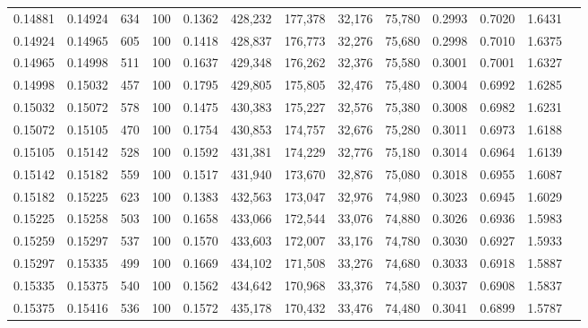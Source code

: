 \begin{tabular}{rrrrrrrrrrrrr}
0.14881 & 0.14924 &   634 & 100 &                                     0.1362 & 428,232 & 177,378 &  32,176 &  75,780 & 0.2993 & 0.7020 & 1.6431 \\
0.14924 & 0.14965 &   605 & 100 &                                     0.1418 & 428,837 & 176,773 &  32,276 &  75,680 & 0.2998 & 0.7010 & 1.6375 \\
0.14965 & 0.14998 &   511 & 100 &                                     0.1637 & 429,348 & 176,262 &  32,376 &  75,580 & 0.3001 & 0.7001 & 1.6327 \\
0.14998 & 0.15032 &   457 & 100 &                                     0.1795 & 429,805 & 175,805 &  32,476 &  75,480 & 0.3004 & 0.6992 & 1.6285 \\
0.15032 & 0.15072 &   578 & 100 &                                     0.1475 & 430,383 & 175,227 &  32,576 &  75,380 & 0.3008 & 0.6982 & 1.6231 \\
0.15072 & 0.15105 &   470 & 100 &                                     0.1754 & 430,853 & 174,757 &  32,676 &  75,280 & 0.3011 & 0.6973 & 1.6188 \\
0.15105 & 0.15142 &   528 & 100 &                                     0.1592 & 431,381 & 174,229 &  32,776 &  75,180 & 0.3014 & 0.6964 & 1.6139 \\
0.15142 & 0.15182 &   559 & 100 &                                     0.1517 & 431,940 & 173,670 &  32,876 &  75,080 & 0.3018 & 0.6955 & 1.6087 \\
0.15182 & 0.15225 &   623 & 100 &                                     0.1383 & 432,563 & 173,047 &  32,976 &  74,980 & 0.3023 & 0.6945 & 1.6029 \\
0.15225 & 0.15258 &   503 & 100 &                                     0.1658 & 433,066 & 172,544 &  33,076 &  74,880 & 0.3026 & 0.6936 & 1.5983 \\
0.15259 & 0.15297 &   537 & 100 &                                     0.1570 & 433,603 & 172,007 &  33,176 &  74,780 & 0.3030 & 0.6927 & 1.5933 \\
0.15297 & 0.15335 &   499 & 100 &                                     0.1669 & 434,102 & 171,508 &  33,276 &  74,680 & 0.3033 & 0.6918 & 1.5887 \\
0.15335 & 0.15375 &   540 & 100 &                                     0.1562 & 434,642 & 170,968 &  33,376 &  74,580 & 0.3037 & 0.6908 & 1.5837 \\
0.15375 & 0.15416 &   536 & 100 &                                     0.1572 & 435,178 & 170,432 &  33,476 &  74,480 & 0.3041 & 0.6899 & 1.5787 \\

\end{tabular}
